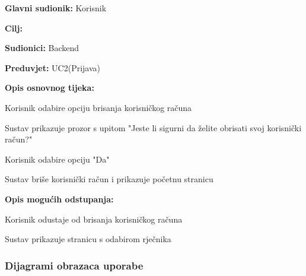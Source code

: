 					\noindent {}
					\begin{packed_item}
						
						\item \textbf{Glavni sudionik: } Korisnik
						\item  \textbf{Cilj:} 
						\item  \textbf{Sudionici:} Backend
						\item  \textbf{Preduvjet:} UC2(Prijava)
						\item  \textbf{Opis osnovnog tijeka:}
						
						\item[] \begin{packed_enum}
							
							\item Korisnik odabire opciju brisanja korisničkog računa
							\item Sustav prikazuje prozor s upitom "Jeste li sigurni da želite obrisati svoj korisnički račun?"
							\item Korisnik odabire opciju "Da"
							\item Sustav briše korisnički račun i prikazuje početnu stranicu
						\end{packed_enum}
						
						\item  \textbf{Opis mogućih odstupanja:}
						
						\item[] \begin{packed_item}
							
							\item[3.a] Korisnik odustaje od brisanja korisničkog računa
							\item[] \begin{packed_enum}
								
								\item Sustav prikazuje stranicu s odabirom rječnika
								
							\end{packed_enum}
							
						\end{packed_item}
					\end{packed_item}
					
				\subsubsection{Dijagrami obrazaca uporabe}
					
